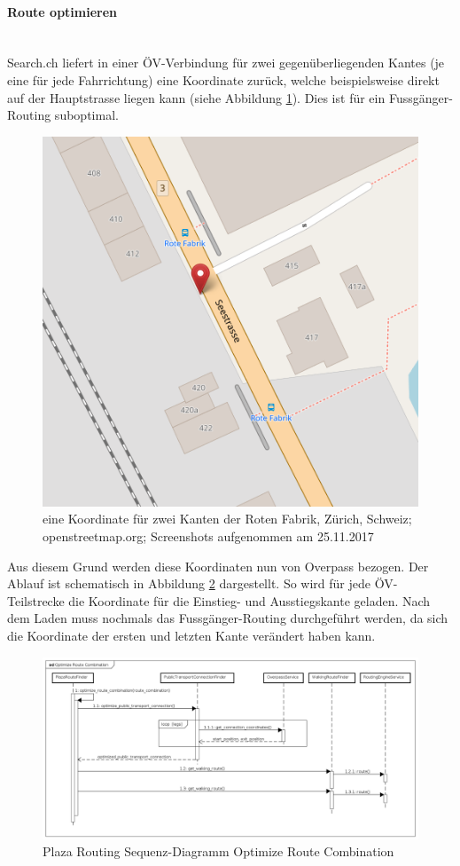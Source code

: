 \paragraph{Route optimieren}\label{impl:Plaza Routing Route optimieren}~\\
Search.ch \cite{search_ch_route_api} liefert in einer ÖV-Verbindung für zwei gegenüberliegenden \glspl{Kante} (je eine für jede Fahrrichtung) eine Koordinate zurück, welche beispielsweise direkt auf der Hauptstrasse liegen kann (siehe Abbildung \ref{fig:one_coordinate_for_two_stops}). Dies ist für ein Fussgänger-Routing suboptimal.

\begin{figure}[ht]
\centering
\includegraphics[width=0.5\linewidth]{projectdoc/img/one_coordinate_for_two_stops}
\caption[Eine Koordinate für zwei Kanten]{eine Koordinate für zwei Kanten der Roten Fabrik, Zürich, Schweiz; openstreetmap.org; Screenshots aufgenommen am 25.11.2017}
\label{fig:one_coordinate_for_two_stops}
\end{figure}

Aus diesem Grund werden diese Koordinaten nun von Overpass \cite{wiki:overpass} bezogen. Der Ablauf ist schematisch in Abbildung \ref{fig:sequence_diagram_plaza_routing_optimize_route_comb} dargestellt. So wird für jede ÖV-Teilstrecke die Koordinate für die Einstieg- und Ausstiegskante geladen. Nach dem Laden muss nochmals das Fussgänger-Routing durchgeführt werden, da sich die Koordinate der ersten und letzten \gls{Kante} verändert haben kann.

\begin{figure}[ht]
\centering
\includegraphics[width=1\linewidth]{projectdoc/img/sequence_diagram_plaza_routing_optimize_route_comb}
\caption[Plaza Routing Sequenz-Diagramm Optimize Route Combination]{Plaza Routing Sequenz-Diagramm Optimize Route Combination}
\label{fig:sequence_diagram_plaza_routing_optimize_route_comb}
\end{figure}

